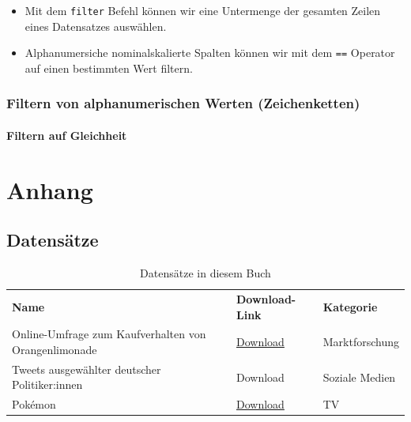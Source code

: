 \documentclass[
]{book}
\providecommand{\tightlist}{%
  \setlength{\itemsep}{0pt}\setlength{\parskip}{0pt}}
\begin{document}
\begin{itemize}
\tightlist
\item
  Mit dem \texttt{filter} Befehl können wir eine Untermenge der gesamten Zeilen eines Datensatzes auswählen.
\item
  Alphanumersiche nominalskalierte Spalten können wir mit dem \texttt{==} Operator auf einen bestimmten Wert filtern.
\end{itemize}

\hypertarget{filtern-von-alphanumerischen-werten-zeichenketten}{%
\section{Filtern von alphanumerischen Werten (Zeichenketten)}\label{filtern-von-alphanumerischen-werten-zeichenketten}}

\hypertarget{filtern-auf-gleichheit}{%
\subsection{Filtern auf Gleichheit}\label{filtern-auf-gleichheit}}

\hypertarget{part-anhang}{%
\part*{Anhang}\label{part-anhang}}

\hypertarget{datensaetze}{%
\chapter*{Datensätze}\label{datensaetze}}

\begin{longtable}[]{@{}
  >{\raggedright\arraybackslash}p{}
  >{\raggedright\arraybackslash}p{}
  >{\raggedright\arraybackslash}p{}@{}}
\caption{Datensätze in diesem Buch}\tabularnewline
\toprule
\endhead
\textbf{Name} & \textbf{Download-Link} & \textbf{Kategorie} \\
Online-Umfrage zum Kaufverhalten von Orangenlimonade & \href{datasets/limonade.csv}{Download} & Marktforschung \\
Tweets ausgewählter deutscher Politiker:innen & Download & Soziale Medien \\
Pokémon & \href{datasets/pokemon.csv}{Download} & TV \\
\bottomrule
\end{longtable}

  
\end{document}
